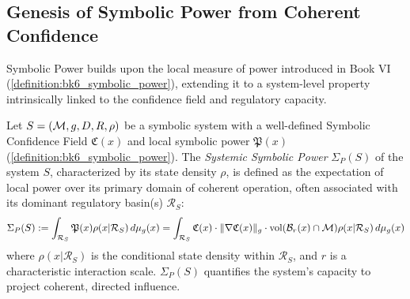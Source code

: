 \subsection{Genesis of Symbolic Power from Coherent Confidence}
\label{subsec:bk7_genesis_symbolic_power}
Symbolic Power builds upon the local measure of power introduced in Book VI (\ref{definition:bk6_symbolic_power}), extending it to a system-level property intrinsically linked to the confidence field and regulatory capacity.

\begin{definition}
\label{definition:bk7_systemic_symbolic_power}
Let \(S = (\mathcal{M}, g, D, R, \rho)\) be a symbolic system with a well-defined Symbolic Confidence Field \(\mathfrak{C}(x)\) and local symbolic power \(\mathfrak{P}(x)\) (\ref{definition:bk6_symbolic_power}). The \emph{Systemic Symbolic Power} \(\Sigma_P(S)\) of the system \(S\), characterized by its state density \(\rho\), is defined as the expectation of local power over its primary domain of coherent operation, often associated with its dominant regulatory basin(s) \(\mathcal{R}_S\):
\[
\Sigma_P(S) := \int_{\mathcal{R}_S} \mathfrak{P}(x) \rho(x|\mathcal{R}_S) \, d\mu_g(x) = \int_{\mathcal{R}_S} \mathfrak{C}(x) \cdot \|\nabla \mathfrak{C}(x)\|_{g} \cdot \text{vol}(\mathcal{B}_r(x) \cap \mathcal{M}) \rho(x|\mathcal{R}_S) \, d\mu_g(x)
\]
where \(\rho(x|\mathcal{R}_S)\) is the conditional state density within \(\mathcal{R}_S\), and \(r\) is a characteristic interaction scale. \(\Sigma_P(S)\) quantifies the system's capacity to project coherent, directed influence.
\scite{\ref{definition:bk6_symbolic_power}, \ref{definition:bk6_symbolic_confidence_field}, \ref{definition:bk6_regulatory_basin}}
\end{definition}

